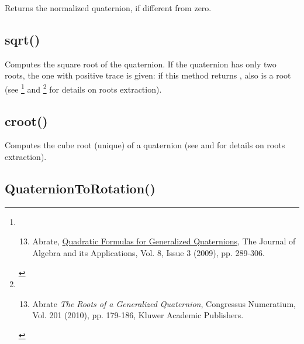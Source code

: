 \documentclass[letterpaper,10pt,english]{sphinxmanual}
\begin{document}
Returns the normalized quaternion, if different from zero.


\subsection{sqrt()}
\label{methods:sqrt}

\begin{fulllineitems}
\end{fulllineitems}


Computes the square root of the quaternion. If the quaternion has only two roots, the one with positive trace is given: if this method returns , also  is a root (see \footnote{\begin{enumerate}
\setcounter{enumi}{12}
\item {} 
Abrate, \href{http://www.worldscinet.com/jaa/08/0803/S0219498809003308.html}{Quadratic Formulas for Generalized Quaternions}, The Journal of Algebra and its Applications, Vol. 8, Issue 3 (2009), pp. 289-306.

\end{enumerate}
} and \footnote{\begin{enumerate}
\setcounter{enumi}{12}
\item {} 
Abrate \emph{The Roots of a Generalized Quaternion}, Congressus Numeratium, Vol. 201 (2010), pp. 179-186, Kluwer Academic Publishers.

\end{enumerate}
} for details on roots extraction).


\subsection{croot()}
\label{methods:croot}

\begin{fulllineitems}
\end{fulllineitems}


Computes the cube root (unique) of a quaternion (see \footnotemark[1] and \footnotemark[2] for details on roots extraction).


\subsection{QuaternionToRotation()}
\label{methods:quaterniontorotation}
\end{document}
